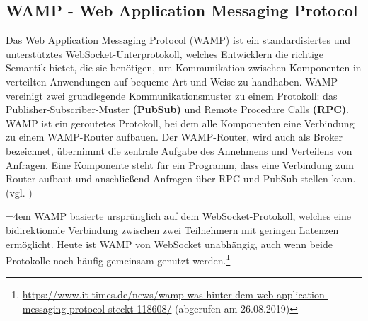 \subsection{WAMP - Web Application Messaging Protocol}
\label{sec:wamp}
Das Web Application Messaging Protocol (WAMP) ist ein standardisiertes und unterstütztes WebSocket-Unterprotokoll, welches Entwicklern die richtige Semantik bietet, die sie benötigen, um Kommunikation zwischen Komponenten in verteilten Anwendungen auf bequeme Art und Weise zu handhaben. WAMP vereinigt zwei grundlegende Kommunikationsmuster zu einem Protokoll: das Publisher-Subscriber-Muster \textbf{(PubSub)} und Remote Procedure Calls \textbf{(RPC)}. WAMP ist ein geroutetes Protokoll, bei dem alle Komponenten eine Verbindung zu einem WAMP-Router aufbauen. Der WAMP-Router, wird auch als Broker bezeichnet, übernimmt die zentrale Aufgabe des Annehmens und Verteilens von Anfragen. Eine Komponente steht für ein Programm, dass eine Verbindung zum Router aufbaut und anschließend Anfragen über RPC und PubSub stellen kann.(vgl. \cite{wamp})\bigskip

\par
\begingroup
\leftskip=4em %
\rightskip\leftskip
\noindent \glqq WAMP basierte ursprünglich auf dem WebSocket-Protokoll, welches eine bidirektionale Verbindung zwischen zwei Teilnehmern mit geringen Latenzen ermöglicht. Heute ist WAMP von WebSocket unabhängig, auch wenn beide Protokolle noch häufig gemeinsam genutzt werden.\grqq{}\footnote{\url{https://www.it-times.de/news/wamp-was-hinter-dem-web-application-messaging-protocol-steckt-118608/} (abgerufen am 26.08.2019)}
\par
\endgroup

